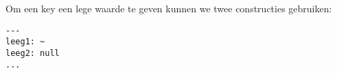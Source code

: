 Om een key een lege waarde te geven kunnen we twee constructies gebruiken:
\begin{verbatim}
---
leeg1: ~
leeg2: null
...
\end{verbatim}

